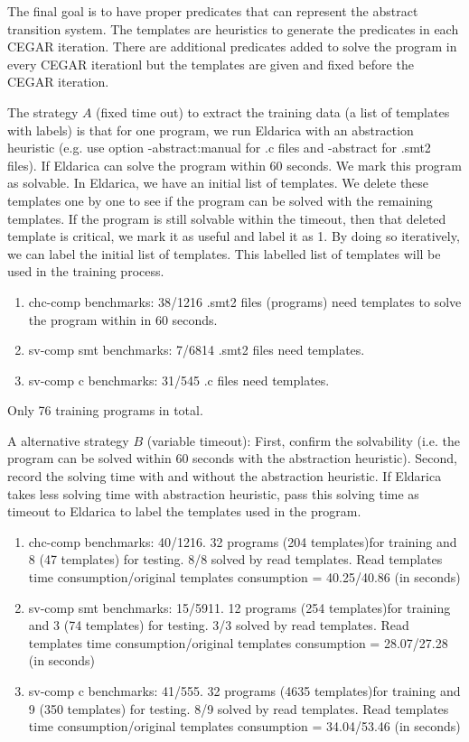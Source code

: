 \documentclass{article}
\begin{document}
The final goal is to have proper predicates that can represent the abstract transition system. The templates are heuristics to generate the predicates in each CEGAR iteration. There are additional predicates added to solve the program in every CEGAR iterationl but the templates are given and fixed before the CEGAR iteration.

The strategy $A$ (fixed time out) to extract the training data (a list of templates with labels) is that for one program, we run Eldarica with an abstraction heuristic (e.g. use option -abstract:manual for .c files and -abstract for .smt2 files). If Eldarica can solve the program within 60 seconds. We mark this program as solvable. In Eldarica, we have an initial list of templates. We delete these templates one by one to see if the program can be solved with the remaining templates. If the program is still solvable within the timeout, then that deleted template is critical, we mark it as useful and label it as 1. By doing so iteratively, we can label the initial list of templates. This labelled list of templates will be used in the training process.

\begin{enumerate}
  \item chc-comp benchmarks: 38/1216 .smt2 files (programs) need templates to solve the program within in 60 seconds.
  \item sv-comp smt benchmarks: 7/6814 .smt2 files need templates.
  \item sv-comp c benchmarks: 31/545 .c files need templates.
\end{enumerate}

Only 76 training programs in total.

A alternative strategy $B$ (variable timeout): First, confirm the solvability (i.e. the program can be solved within 60 seconds with the abstraction heuristic).
Second, record the solving time with and without the abstraction heuristic. If Eldarica takes less solving time with abstraction heuristic, pass this solving time as timeout to Eldarica to label the templates used in the program.

\begin{enumerate}
  \item chc-comp benchmarks: 40/1216.  32 programs (204 templates)for training and 8 (47 templates) for testing. 8/8 solved by read templates. Read templates time consumption/original templates consumption =  40.25/40.86 (in seconds)
  \item sv-comp smt benchmarks: 15/5911.  12 programs (254 templates)for training and 3 (74 templates) for testing. 3/3 solved by read templates. Read templates time consumption/original templates consumption =  28.07/27.28 (in seconds)
  \item sv-comp c benchmarks: 41/555.  32 programs (4635 templates)for training and 9 (350 templates) for testing. 8/9 solved by read templates. Read templates time consumption/original templates consumption = 34.04/53.46  (in seconds)
\end{enumerate}
\end{document}
